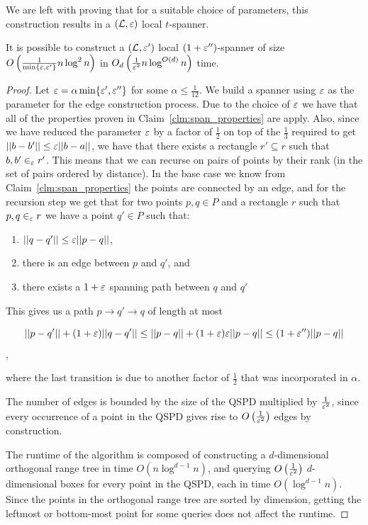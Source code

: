 \documentclass[12pt]{article}%
\begin{document}
We are left with proving that for a suitable choice of parameters, this construction results in a $(\mathcal{L},\varepsilon)$ local $t$-spanner.


\begin{claim}
	It is possible to construct a $(\mathcal{L}, \varepsilon')$ local $(1+\varepsilon'')$-spanner of size $O\left(\frac{1}{\min\{\varepsilon, \varepsilon'\}}n\log^2n\right)$ in $O_d\left(\frac{1}{\varepsilon^2}n\log^{O(d)}n\right)$ time.
\end{claim} 

\begin{proof} 
	Let $\varepsilon = \alpha \min \{\varepsilon',\varepsilon''\}$ for some $\alpha \leq \frac{1}{12}$. We build a spanner using $\varepsilon$ as the parameter for the edge construction process. Due to the choice of $\varepsilon$ we have that all of the properties proven in Claim~\ref{clm:span_properties} are apply. Also, since we have reduced the parameter $\varepsilon$ by a factor of $\frac{1}{2}$ on top of the $\frac{1}{3}$ required to get $||b-b'||\leq \varepsilon ||b-a||$, we have that there exists a rectangle $r'\subseteq r$ such that $b,b'\in_{\varepsilon}r'$. This means that we can recurse on pairs of points by their rank (in the set of pairs ordered by distance). In the base case we know from Claim~\ref{clm:span_properties} the points are connected by an edge, and for the recursion step we get that for two points $p,q\in P$ and a rectangle $r$ such that $p,q\in_{\varepsilon} r$ we have a point $q'\in P$ such that:
	\begin{enumerate}
		\item $||q-q'||\leq \varepsilon||p-q||$,
		\item there is an edge between $p$ and $q'$, and
		\item there exists a $1+\varepsilon$ spanning path between $q$ and $q'$
	\end{enumerate}

	This gives us a path $p\rightarrow q' \rightarrow q$ of length at most
	
	$$||p-q'||+(1+\varepsilon)||q-q'||\leq ||p-q||+(1+\varepsilon)\varepsilon||p-q||\leq (1+\varepsilon'')||p-q||$$,
	
	where the last transition is due to another factor of $\frac{1}{2}$ that was incorporated in $\alpha$. 
	
	The number of edges is bounded by the size of the QSPD multiplied by $\frac{1}{\varepsilon^2}$, since every occurrence of a point in the QSPD gives rise to $O\left(\frac{1}{\varepsilon^2}\right)$ edges by construction.
	
	The runtime of the algorithm is composed of constructing a $d$-dimensional orthogonal range tree in time $O(n\log^{d-1}n)$, and querying $O\left(\frac{1}{\varepsilon^2}\right)$ $d$-dimensional boxes for every point in the QSPD, each in time $O(\log^{d-1}n)$. Since the points in the orthogonal range tree are sorted by dimension, getting the leftmost or bottom-most point for some queries does not affect the runtime.
	
\end{proof}
\end{document}
